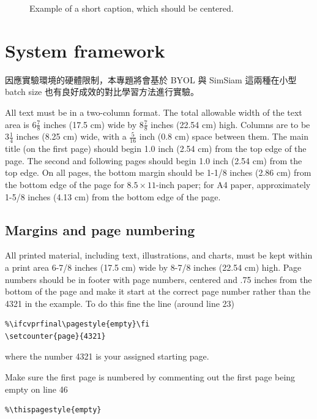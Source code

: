 \documentclass[10pt,twocolumn,letterpaper]{article}
\begin{document}
\begin{CJK}{UTF8}{bkai}
\begin{figure}
\begin{center}
      \end{center}
      \caption{Example of a short caption, which should be centered.}
      \label{fig:short}
   \end{figure}

   \section{System framework}
   因應實驗環境的硬體限制，本專題將會基於 BYOL 與 SimSiam
   這兩種在小型 batch size 也有良好成效的對比學習方法進行實驗。

   All text must be in a two-column format. The total allowable width of the
   text area is $6\frac78$ inches (17.5 cm) wide by $8\frac78$ inches (22.54
   cm) high. Columns are to be $3\frac14$ inches (8.25 cm) wide, with a
   $\frac{5}{16}$ inch (0.8 cm) space between them. The main title (on the
   first page) should begin 1.0 inch (2.54 cm) from the top edge of the
   page. The second and following pages should begin 1.0 inch (2.54 cm) from
   the top edge. On all pages, the bottom margin should be 1-1/8 inches (2.86
   cm) from the bottom edge of the page for $8.5 \times 11$-inch paper; for A4
   paper, approximately 1-5/8 inches (4.13 cm) from the bottom edge of the
   page.

   \subsection{Margins and page numbering}

   All printed material, including text, illustrations, and charts, must be kept
   within a print area 6-7/8 inches (17.5 cm) wide by 8-7/8 inches (22.54 cm)
   high.
   Page numbers should be in footer with page numbers, centered and .75
   inches from the bottom of the page and make it start at the correct page
   number rather than the 4321 in the example.  To do this fine the line (around
   line 23)
   \begin{verbatim}
%\ifcvprfinal\pagestyle{empty}\fi
\setcounter{page}{4321}
\end{verbatim}
   where the number 4321 is your assigned starting page.

   Make sure the first page is numbered by commenting out the first page being
   empty on line 46
   \begin{verbatim}
%\thispagestyle{empty}
\end{verbatim}



\end{CJK}
\end{document}
